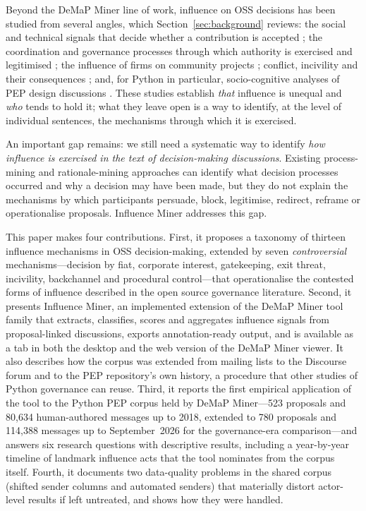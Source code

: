 \documentclass[sigconf,screen]{acmart}
\begin{document}
Beyond the DeMaP Miner line of work, influence on OSS decisions has been studied from several angles, which Section~\ref{sec:background} reviews: the social and technical signals that decide whether a contribution is accepted \cite{tsay2014, tsay2014b, marlow2013, alami2020}; the coordination and governance processes through which authority is exercised and legitimised \cite{shaikh2017, lindberg2016, howison2014, delaat2007}; the influence of firms on community projects \cite{dahlander2006, schaarschmidt2015, riehle2014, zhang2021, zhang2022}; conflict, incivility and their consequences \cite{elliott2003, jensen2004, filippova2016, ferreira2021, miller2022}; and, for Python in particular, socio-cognitive analyses of PEP design discussions \cite{sack2006, barcellini2008a, barcellini2008b, ducheneaut2005}. These studies establish \emph{that} influence is unequal and \emph{who} tends to hold it; what they leave open is a way to identify, at the level of individual sentences, the mechanisms through which it is exercised.

An important gap remains: we still need a systematic way to identify \emph{how influence is exercised in the text of decision-making discussions}. Existing process-mining and rationale-mining approaches can identify what decision processes occurred and why a decision may have been made, but they do not explain the mechanisms by which participants persuade, block, legitimise, redirect, reframe or operationalise proposals. Influence Miner addresses this gap.

This paper makes four contributions. First, it proposes a taxonomy of thirteen influence mechanisms in OSS decision-making, extended by seven \emph{controversial} mechanisms---decision by fiat, corporate interest, gatekeeping, exit threat, incivility, backchannel and procedural control---that operationalise the contested forms of influence described in the open source governance literature. Second, it presents Influence Miner, an implemented extension of the DeMaP Miner tool family that extracts, classifies, scores and aggregates influence signals from proposal-linked discussions, exports annotation-ready output, and is available as a tab in both the desktop and the web version of the DeMaP Miner viewer. It also describes how the corpus was extended from mailing lists to the Discourse forum and to the PEP repository's own history, a procedure that other studies of Python governance can reuse. Third, it reports the first empirical application of the tool to the Python PEP corpus held by DeMaP Miner---523 proposals and 80,634 human-authored messages up to 2018, extended to 780 proposals and 114,388 messages up to September~2026 for the governance-era comparison---and answers six research questions with descriptive results, including a year-by-year timeline of landmark influence acts that the tool nominates from the corpus itself. Fourth, it documents two data-quality problems in the shared corpus (shifted sender columns and automated senders) that materially distort actor-level results if left untreated, and shows how they were handled.
\end{document}
